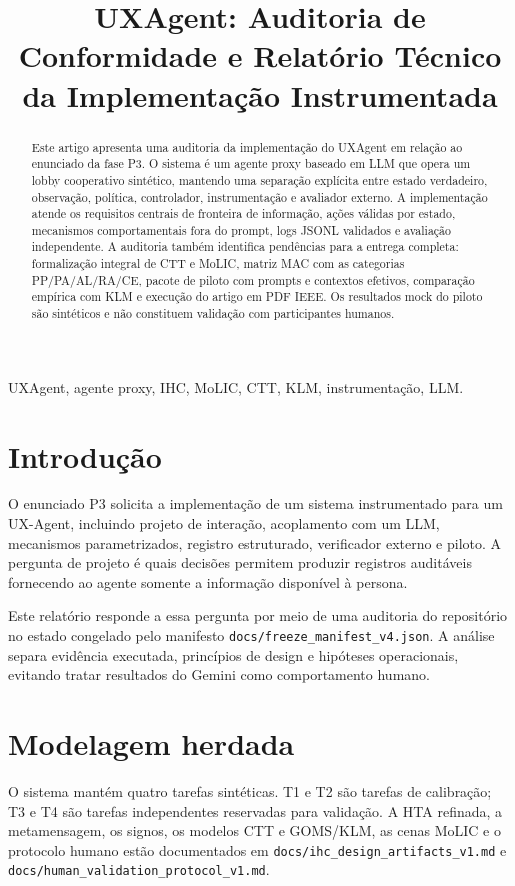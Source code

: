 \documentclass[conference]{IEEEtran}
\title{UXAgent: Auditoria de Conformidade e Relatório Técnico da Implementação Instrumentada}
\author{\IEEEauthorblockN{Projeto UXAgent}
\IEEEauthorblockA{Disciplina de Interação Humano--Computador\\
Centro Federal de Educação Tecnológica\\
Brasil}}
\begin{document}
\maketitle

\begin{abstract}
Este artigo apresenta uma auditoria da implementação do UXAgent em relação ao
enunciado da fase P3. O sistema é um agente proxy baseado em LLM que opera um
lobby cooperativo sintético, mantendo uma separação explícita entre estado
verdadeiro, observação, política, controlador, instrumentação e avaliador
externo. A implementação atende os requisitos centrais de fronteira de
informação, ações válidas por estado, mecanismos comportamentais fora do
prompt, logs JSONL validados e avaliação independente. A auditoria também
identifica pendências para a entrega completa: formalização integral de CTT e
MoLIC, matriz MAC com as categorias PP/PA/AL/RA/CE, pacote de piloto com
prompts e contextos efetivos, comparação empírica com KLM e execução do artigo
em PDF IEEE. Os resultados mock do piloto são sintéticos e não constituem
validação com participantes humanos.
\end{abstract}

\begin{IEEEkeywords}
UXAgent, agente proxy, IHC, MoLIC, CTT, KLM, instrumentação, LLM.
\end{IEEEkeywords}

\section{Introdução}
O enunciado P3 solicita a implementação de um sistema instrumentado para um
UX-Agent, incluindo projeto de interação, acoplamento com um LLM, mecanismos
parametrizados, registro estruturado, verificador externo e piloto. A pergunta
de projeto é quais decisões permitem produzir registros auditáveis fornecendo
ao agente somente a informação disponível à persona.

Este relatório responde a essa pergunta por meio de uma auditoria do
repositório no estado congelado pelo manifesto
\texttt{docs/freeze\_manifest\_v4.json}. A análise separa evidência executada,
princípios de design e hipóteses operacionais, evitando tratar resultados do
Gemini como comportamento humano.

\section{Modelagem herdada}
O sistema mantém quatro tarefas sintéticas. T1 e T2 são tarefas de calibração;
T3 e T4 são tarefas independentes reservadas para validação. A HTA refinada,
a metamensagem, os signos, os modelos CTT e GOMS/KLM, as cenas MoLIC e o
protocolo humano estão documentados em
\texttt{docs/ihc\_design\_artifacts\_v1.md} e
\texttt{docs/human\_validation\_protocol\_v1.md}.
\end{document}
